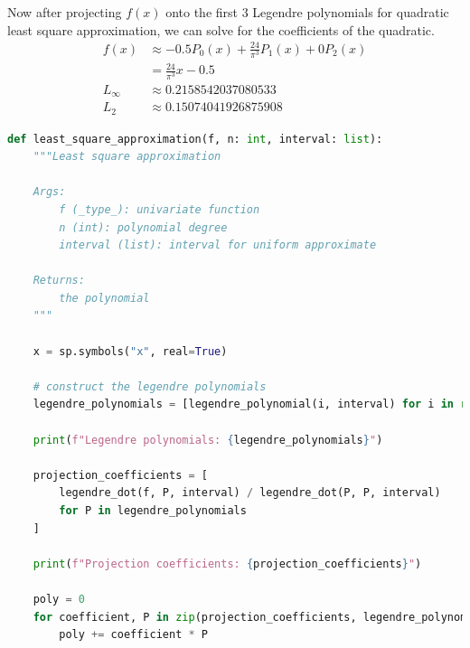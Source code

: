 \documentclass[conference,onecolumn]{IEEEtran}
\begin{document}
\begin{enumerate}[label=\arabic{enumi}.]
\begin{enumerate}
                        Now after projecting $f(x)$ onto the first 3 Legendre polynomials for quadratic least square approximation, we can solve for the coefficients of the quadratic.
                        \begin{align*}
                              f(x)     & \approx -0.5 P_0(x) + \frac{24}{\pi^3} P_1(x) + 0 P_2(x) \\
                                       & = \frac{24}{\pi^3} x - 0.5                               \\
                              L_\infty & \approx 0.2158542037080533                               \\
                              L_2      & \approx 0.15074041926875908
                        \end{align*}
                        \begin{lstlisting}[language=Python]
def least_square_approximation(f, n: int, interval: list):
    """Least square approximation

    Args:
        f (_type_): univariate function
        n (int): polynomial degree
        interval (list): interval for uniform approximate

    Returns:
        the polynomial
    """

    x = sp.symbols("x", real=True)

    # construct the legendre polynomials
    legendre_polynomials = [legendre_polynomial(i, interval) for i in range(n + 1)]

    print(f"Legendre polynomials: {legendre_polynomials}")

    projection_coefficients = [
        legendre_dot(f, P, interval) / legendre_dot(P, P, interval)
        for P in legendre_polynomials
    ]

    print(f"Projection coefficients: {projection_coefficients}")

    poly = 0
    for coefficient, P in zip(projection_coefficients, legendre_polynomials):
        poly += coefficient * P


\end{lstlisting}
\end{enumerate}
\end{enumerate}
\end{document}
